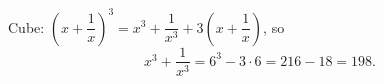 Cube: $\left(x+\dfrac{1}{x}\right)^3=x^3+\dfrac{1}{x^3}+3\left(x+\dfrac{1}{x}\right)$, so
\[x^3+\dfrac{1}{x^3}=6^3-3\cdot6=216-18=\boxed{198}.\]
